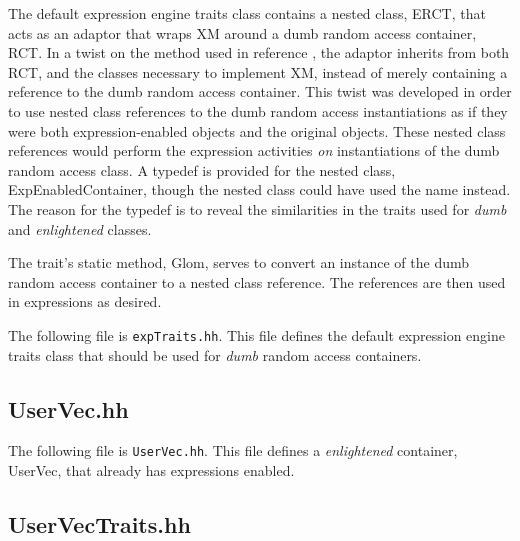 \documentclass[11pt]{nmemo}
\newcommand{\cxxcode}{\color{codecolor}}
\newcommand{\code}[1]{\textcolor{codecolor}{#1}}
\begin{document}
The default expression engine traits class contains a nested class,
\code{ERCT}, that
acts as an adaptor that wraps \code{XM} around a dumb random access
container, \code{RCT}\cite{Austern99}\cite{Furnish98}.
In a twist on the method used in reference \cite{Furnish98},
the adaptor inherits from both \code{RCT}, and
the classes necessary to implement \code{XM},
instead of merely containing a reference to the dumb random access container.
This twist was developed in order to use nested class
references to the dumb random access instantiations as 
if they were both expression-enabled objects and the original objects.
These nested class references would perform the expression activities \emph{on}
instantiations of the dumb random access class.
A typedef is provided for the nested class, \code{ExpEnabledContainer},
though the nested class could have used the name instead.
The reason for the typedef is to reveal the similarities in the traits
used for \emph{dumb} and \emph{enlightened} classes.

The trait's static method, \code{Glom}, serves to convert an instance
of the dumb random access container to a nested class reference.
The references are then used in expressions as desired.

The following file is \texttt{expTraits.hh}.
This file defines the default expression engine traits class that
should be used for \emph{dumb}
random access containers.

\begin{ttfamily}
\begin{small}
\cxxcode

\end{small}
\end{ttfamily}

\subsection{UserVec.hh}

The following file is \texttt{UserVec.hh}.
This file defines a \emph{enlightened} container, \code{UserVec},
that already has expressions enabled\cite{Furnish97}.

\begin{ttfamily}
\begin{small}
\cxxcode

\end{small}
\end{ttfamily}

\subsection{UserVecTraits.hh}
\end{document}
